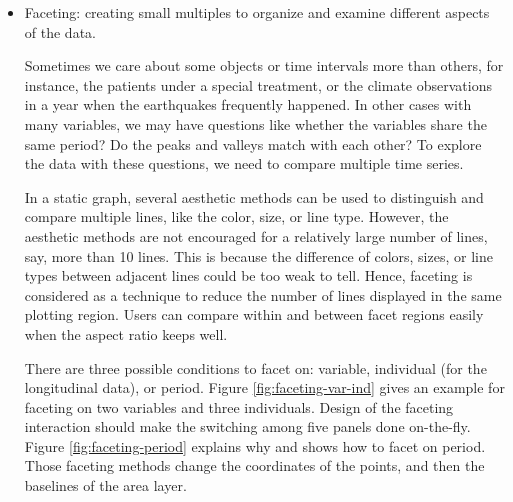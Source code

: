 \documentclass[12pt]{article}
\begin{document}
\begin{itemize}
\begin{center}
\par\end{center}


\item Faceting: creating small multiples to organize and
examine different aspects of the data.

Sometimes we care about some objects or time intervals more than others,
for instance, the patients under a special treatment, or the climate
observations in a year when the earthquakes frequently happened. In
other cases with many variables, we may have questions like whether
the variables share the same period? Do the peaks and valleys match
with each other? To explore the data with these questions, we need
to compare multiple time series.

In a static graph, several aesthetic methods can be used to distinguish
and compare multiple lines, like the color, size, or line type. However,
the aesthetic methods are not encouraged for a relatively large number
of lines, say, more than 10 lines. This is because the difference
of colors, sizes, or line types between adjacent lines could be too
weak to tell. Hence, faceting is considered as a technique to reduce
the number of lines displayed in the same plotting region. Users can compare
within and between facet regions easily when the aspect ratio keeps
well.

There are three possible conditions to facet on: variable, individual
 (for the longitudinal data), or period. Figure \ref{fig:faceting-var-ind}
gives an example for faceting on two variables and three individuals.
Design of the faceting interaction should make the switching among
five panels done on-the-fly. 
Figure \ref{fig:faceting-period} explains why and shows how to
facet on period. Those faceting methods change the coordinates
of the points, and then the baselines of the area layer.


\end{itemize}
\end{document}
